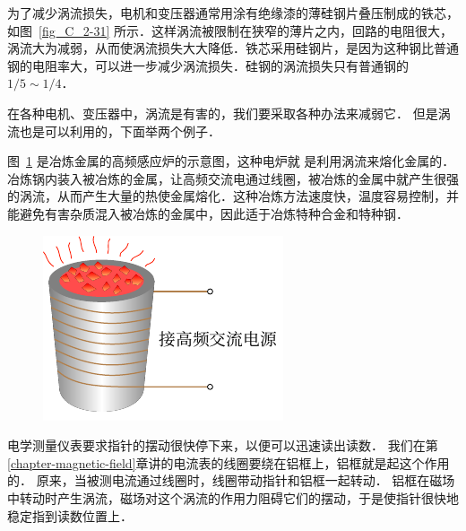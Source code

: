 为了减少涡流损失，电机和变压器通常用涂有绝缘漆的薄硅钢片叠压制成的铁芯，如图~\ref{fig_C_2-31} 所示．这样涡流被限制在狭窄的薄片之内，回路的电阻很大，涡流大为减弱，从而使涡流损失大大降低．铁芯采用硅钢片，是因为这种钢比普通钢的电阻率大，可以进一步减少涡流损失．硅钢的涡流损失只有普通钢的$1/5 \sim 1/4$．

在各种电机、变压器中，涡流是有害的，我们要采取各种办法来减弱它．
但是涡流也是可以利用的，下面举两个例子．


图~\ref{fig_C_2-32} 是冶炼金属的高频感应炉的示意图，这种电炉就
是利用涡流来熔化金属的．
冶炼锅内装入被冶炼的金属，让高频交流电通过线圈，被冶炼的金属中就产生很强的涡流，从而产生大量的热使金属熔化．这种冶炼方法速度快，温度容易控制，并能避免有害杂质混入被冶炼的金属中，因此适于冶炼特种合金和特种钢．
\begin{figure}[htbp]
	\centering
	\includegraphics{fig/C/2-32.pdf}
	\caption{}\label{fig_C_2-32}
\end{figure}



电学测量仪表要求指针的摆动很快停下来，以便可以迅速读出读数．
我们在第\ref{chapter-magnetic-field}章讲的电流表的线圈要绕在铝框上，铝框就是起这个作用的．
原来，当被测电流通过线圈时，线圈带动指针和铝框一起转动．
铝框在磁场中转动时产生涡流，磁场对这个涡流的作用力阻碍它们的摆动，于是使指针很快地稳定指到读数位置上．

